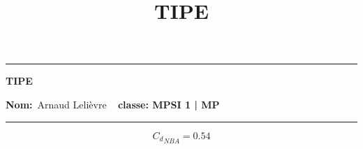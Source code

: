 \documentclass{article}
\title{TIPE}
\begin{document}
\begin{center}
  \hrule
	\vspace{.4cm}
	{\textbf{\large TIPE}}
\end{center}

{\textbf{Nom:}\ Arnaud Lelièvre \hspace{\fill} \vspace{0.5cm}}
{\textbf{}\  \hspace{\fill} \vspace{0.5cm}}
{\textbf{classe: MPSI 1 | MP}\ \hspace{\fill}}
\hrule
\date{}

\vspace{1cm}

\begin{center}
	\begin{equation}
		{C_d}_{NBA} = 0.54
	\end{equation}
\end{center}

\vspace{0.6cm}
\vspace{0.6cm}
\end{document}
